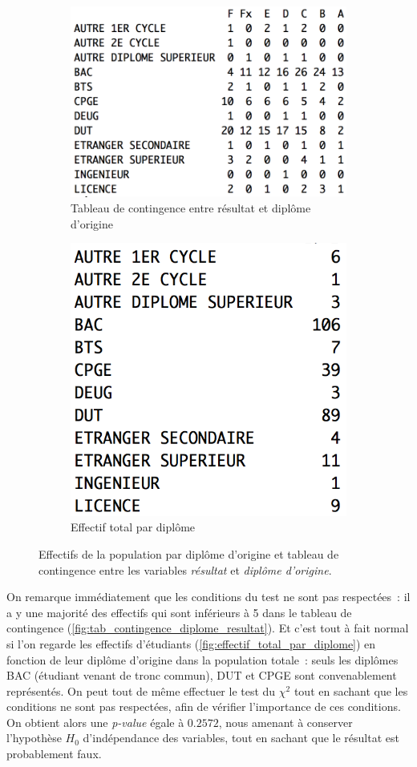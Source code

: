\documentclass[a4paper,10pt]{report}
\begin{document}
\begin{figure}[H]
	\centering
	\captionsetup{justification=centering, margin=2cm}
	\begin{subfigure}[b]{0.5\linewidth}
		\centering
		\captionsetup{justification=centering, margin=1cm}
		\includegraphics[width=0.65\linewidth]{img/1-1-2-Contingence-Result-Diplome-Origine}
		\caption{\scriptsize Tableau de contingence entre résultat et diplôme d'origine}
		\label{fig:tab_contingence_diplome_resultat}
	\end{subfigure}%
	\begin{subfigure}[b]{0.5\linewidth}
		\centering
		\captionsetup{justification=centering, margin=1cm}
		\includegraphics[width=0.5\linewidth]{img/1-1-2-Effectif-Diplome-Origine}
		\caption{\scriptsize Effectif total par diplôme}
		\label{fig:effectif_total_par_diplome}
	\end{subfigure}%
	\caption{
		\small Effectifs de la population par diplôme d'origine et tableau de contingence entre les variables \textit{résultat} et \textit{diplôme d'origine}.
	}
	\label{fig:tab_effectifs_et_contingence_resultats_diplome_origine}%
\end{figure}

On remarque immédiatement que les conditions du test ne sont pas respectées~: il a y une majorité des effectifs qui sont inférieurs à 5 dans le tableau de contingence  (\autoref{fig:tab_contingence_diplome_resultat}). Et c'est tout à fait normal si l'on regarde les effectifs d'étudiants (\autoref{fig:effectif_total_par_diplome}) en fonction de leur diplôme d'origine dans la population totale~: seuls les diplômes BAC (étudiant venant de tronc commun), DUT et CPGE sont convenablement représentés.
On peut tout de même effectuer le test du $\chi^2$ tout en sachant que les conditions ne sont pas respectées, afin de vérifier l'importance de ces conditions. On obtient alors une \textit{p-value} égale à $0.2572$, nous amenant à conserver l'hypothèse $H_{0}$ d'indépendance des variables, tout en sachant que le résultat est probablement faux.
\end{document}
